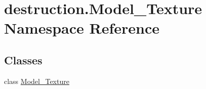 \hypertarget{namespacedestruction_1_1_model___texture}{\section{destruction.\-Model\-\_\-\-Texture Namespace Reference}
\label{namespacedestruction_1_1_model___texture}
}
\subsection*{Classes}
\begin{DoxyCompactItemize}
\item 
class \hyperlink{classdestruction_1_1_model___texture_1_1_model___texture}{Model\-\_\-\-Texture}
\end{DoxyCompactItemize}
